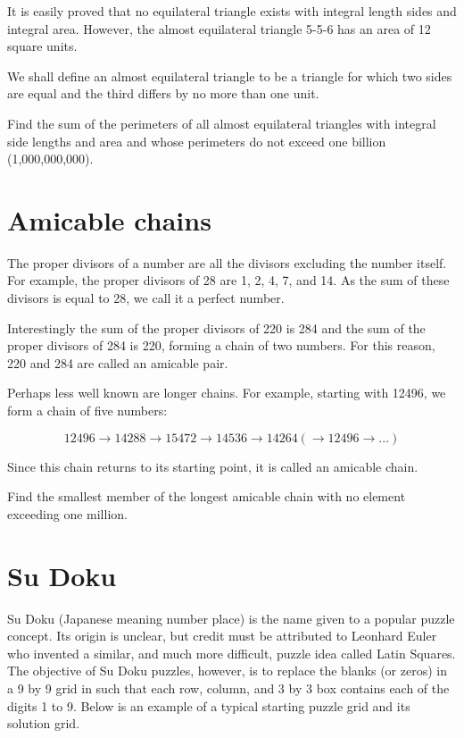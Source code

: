 It is easily proved that no equilateral triangle exists with integral length sides and integral area. However, the almost equilateral triangle 5-5-6 has an area of 12 square units.

We shall define an almost equilateral triangle to be a triangle for which two sides are equal and the third differs by no more than one unit.

Find the sum of the perimeters of all almost equilateral triangles with integral side lengths and area and whose perimeters do not exceed one billion (1,000,000,000).

\section{Amicable chains} \label{pb.095}

The proper divisors of a number are all the divisors excluding the number itself. For example, the proper divisors of 28 are 1, 2, 4, 7, and 14. As the sum of these divisors is equal to 28, we call it a perfect number.

Interestingly the sum of the proper divisors of 220 is 284 and the sum of the proper divisors of 284 is 220, forming a chain of two numbers. For this reason, 220 and 284 are called an amicable pair.

Perhaps less well known are longer chains. For example, starting with 12496, we form a chain of five numbers:

$$12496 \longrightarrow 14288 \longrightarrow 15472 \longrightarrow 14536 \longrightarrow 14264 (\longrightarrow 12496 \longrightarrow ...)$$

Since this chain returns to its starting point, it is called an amicable chain.

Find the smallest member of the longest amicable chain with no element exceeding one million.

\section{Su Doku} \label{pb.096}

Su Doku (Japanese meaning number place) is the name given to a popular puzzle concept. Its origin is unclear, but credit must be attributed to Leonhard Euler who invented a similar, and much more difficult, puzzle idea called Latin Squares. The objective of Su Doku puzzles, however, is to replace the blanks (or zeros) in a 9 by 9 grid in such that each row, column, and 3 by 3 box contains each of the digits 1 to 9. Below is an example of a typical starting puzzle grid and its solution grid.

